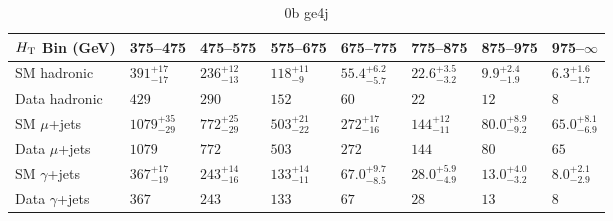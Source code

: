 \documentclass[8pt]{article}
\def\scalht{\mbox{$H_{\rm{T}}$}\xspace}
\newcommand\T{\rule{0pt}{2.6ex}}
\newcommand\B{\rule[-1.2ex]{0pt}{0pt}}
\begin{document}
\begin{table}[ht!]
\caption{0b ge4j}
\label{tab:ensemble-0b ge4j}
\centering
\begin{tabular}{ llllllll }

\hline
\scalht Bin (GeV)       & 375--475                       & 475--575                       & 575--675                       & 675--775                       & 775--875                       & 875--975                       & 975--$\infty$                  \\ [1.000000ex]
\hline
SM hadronic\T           & $391^{+17}_{-17}$              & $236^{+12}_{-13}$              & $118^{+11}_{-9}$               & $55.4^{+6.2}_{-5.7}$           & $22.6^{+3.5}_{-3.2}$           & $9.9^{+2.4}_{-1.9}$            & $6.3^{+1.6}_{-1.7}$            \\ 
Data hadronic\B         & $429$                          & $290$                          & $152$                          & $60$                           & $22$                           & $12$                           & $8$                            \\ 
\hline
SM $\mu$+jets\T         & $1079^{+35}_{-29}$             & $772^{+25}_{-29}$              & $503^{+21}_{-22}$              & $272^{+17}_{-16}$              & $144^{+12}_{-11}$              & $80.0^{+8.9}_{-9.2}$           & $65.0^{+8.1}_{-6.9}$           \\ 
Data $\mu$+jets\B       & $1079$                         & $772$                          & $503$                          & $272$                          & $144$                          & $80$                           & $65$                           \\ 
\hline
SM $\gamma$+jets\T      & $367^{+17}_{-19}$              & $243^{+14}_{-16}$              & $133^{+14}_{-11}$              & $67.0^{+9.7}_{-8.5}$           & $28.0^{+5.9}_{-4.9}$           & $13.0^{+4.0}_{-3.2}$           & $8.0^{+2.1}_{-2.9}$            \\ 
Data $\gamma$+jets\B    & $367$                          & $243$                          & $133$                          & $67$                           & $28$                           & $13$                           & $8$                            \\ 
\hline

\end{tabular}
\end{table}
\end{document}

